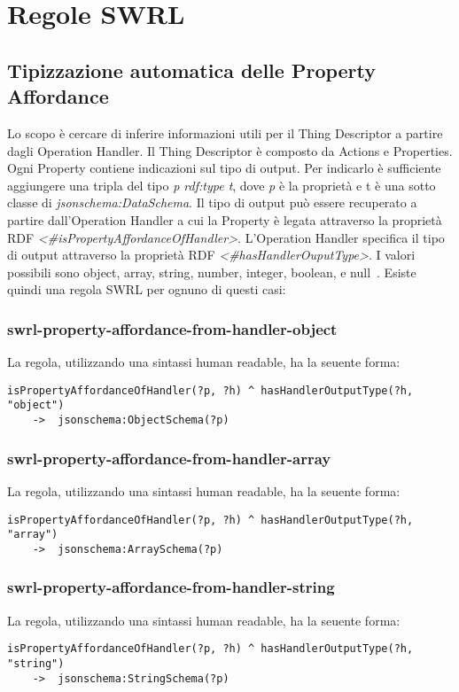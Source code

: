 \section{Regole SWRL}

\subsection{Tipizzazione automatica delle Property Affordance}
Lo scopo è cercare di inferire informazioni utili per il Thing Descriptor a partire dagli Operation Handler. Il Thing Descriptor è composto da Actions e Properties. Ogni Property contiene indicazioni sul tipo di output. Per indicarlo è sufficiente aggiungere una tripla del tipo \textit{p rdf:type t}, dove \textit{p} è la proprietà e t è una sotto classe di \textit{jsonschema:DataSchema}. Il tipo di output può essere recuperato a partire dall'Operation Handler a cui la Property è legata attraverso la proprietà RDF \textit{<\#isPropertyAffordanceOfHandler>}. L'Operation Handler specifica il tipo di output attraverso la proprietà RDF \textit{<\#hasHandlerOuputType>}. I valori possibili sono object, array, string, number, integer, boolean, e null~\cite{WebofThi22:online}.\newline
\noindent Esiste quindi una regola SWRL per ognuno di questi casi:

\subsubsection{swrl-property-affordance-from-handler-object}
La regola, utilizzando una sintassi human readable, ha la seuente forma:
\begin{verbatim}
isPropertyAffordanceOfHandler(?p, ?h) ^ hasHandlerOutputType(?h, "object")
	->  jsonschema:ObjectSchema(?p)
\end{verbatim}

\subsubsection{swrl-property-affordance-from-handler-array}
La regola, utilizzando una sintassi human readable, ha la seuente forma:
\begin{verbatim}
isPropertyAffordanceOfHandler(?p, ?h) ^ hasHandlerOutputType(?h, "array")
	->  jsonschema:ArraySchema(?p)
\end{verbatim}

\subsubsection{swrl-property-affordance-from-handler-string}
La regola, utilizzando una sintassi human readable, ha la seuente forma:
\begin{verbatim}
isPropertyAffordanceOfHandler(?p, ?h) ^ hasHandlerOutputType(?h, "string")
	->  jsonschema:StringSchema(?p)
\end{verbatim}

